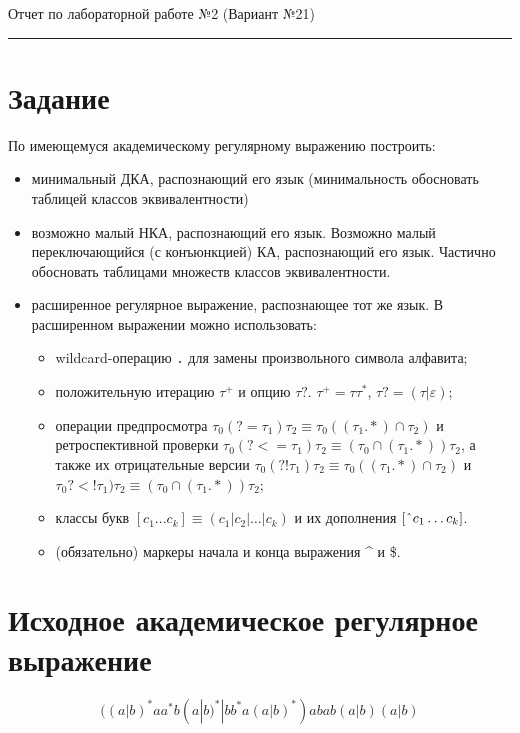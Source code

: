 \documentclass[12pt,a4paper]{article}
\begin{document}
{\Large\bfseries
\begin{flushleft}
Отчет по лабораторной работе №2 (Вариант №21)
\end{flushleft}}
\vspace{0.5em}\hrule\vspace{1.2em}

\section*{Задание}  
По имеющемуся академическому регулярному выражению построить:
\begin{itemize}
  \item минимальный ДКА, распознающий его язык (минимальность обосновать таблицей классов эквивалентности)
  \item возможно малый НКА, распознающий его язык. Возможно малый переключающийся (с конъюнкцией) КА, распознающий его язык. Частично обосновать таблицами множеств классов эквивалентности.
  \item расширенное регулярное выражение, распознающее тот же язык. В расширенном выражении можно использовать:
  \begin{itemize}
    \item wildcard-операцию \texttt{.} для замены произвольного символа алфавита;
    \item положительную итерацию $\tau^{+}$ и опцию $\tau?$. $\tau^{+} = \tau\tau^{*}$, $\tau? = (\tau|\varepsilon)$;
    \item операции предпросмотра $\tau_{0}(?= \tau_{1})\tau_{2} \equiv \tau_{0}((\tau_{1}.*)\cap\tau_{2})$ и ретроспективной проверки
          $\tau_{0}(?<= \tau_{1})\tau_{2} \equiv (\tau_{0}\cap(\tau_{1}.*))\tau_{2}$, а также их отрицательные версии
          $\tau_{0}(?! \tau_{1})\tau_{2} \equiv \tau_{0}((\tau_{1}.*)\cap\tau_{2})$ и
          $\tau_{0}?<! \tau_{1})\tau_{2} \equiv (\tau_{0}\cap(\tau_{1}.*))\tau_{2}$;
    \item классы букв $[c_{1} . . . c_{k}] \equiv (c_{1}|c_{2}|\ldots|c_{k})$ и их дополнения $[\char`^ c_{1} \ldots c_{k}]$.
    \item (обязательно) маркеры начала и конца выражения \^{} и \$.
  \end{itemize}
\end{itemize}

\section*{Исходное академическое регулярное выражение}
\[
((a|b)^{*}aa^{*}b(a|b)^{*}|bb^{*}a(a|b)^{*})abab(a|b)(a|b)
\]
\end{document}
